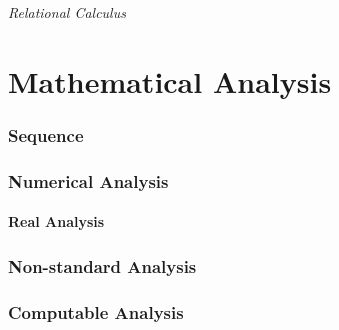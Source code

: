 \documentclass{article}
\begin{document}
\emph{Relational Calculus}



\part{Mathematical Analysis}\label{sec:mathematical_analysis}



\section{Sequence}\label{sec:sequence}



\section{Numerical Analysis}\label{sec:numerical_analysis}

\subsection{Real Analysis}\label{subsec:real_analysis}



\section{Non-standard Analysis}\label{sec:nonstandard_analysis}



\section{Computable Analysis}\label{sec:computable_analysis}
\end{document}
